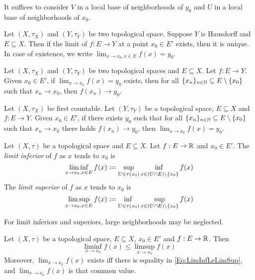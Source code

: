 \documentclass{techreport}
\begin{document}
\begin{remark}\label{Rem:LimitsConsiderLocalbase}
	It suffices to consider $V$ in a local base of neighborhoods of $y_0$ and $U$ in a local base of neighborhoods of $x_0$.
\end{remark}

\begin{proposition}\label{Prop:LimitIntoT2AtMostOne}
	Let $(X,\tau_X)$ and $(Y,\tau_Y)$ be two topological space.
	Suppose $Y$ is Hausdorff and $E \subseteq X$.
	Then if the limit of $f : E \to Y$ at a point $x_0 \in E'$ exists, then it is unique.
	In case of existence, we write $\lim_{x \to x_0, x \in E} f(x) = y_0$.
\end{proposition}

\begin{proposition}\label{Prop:LimitImlySeqConv}
	Let $(X,\tau_X)$ and $(Y,\tau_Y)$ be two topological spaces and $E \subseteq X$.
	Let $f : E \to Y$.
	Given $x_0 \in E'$, if $\lim_{x \to x_0} f(x) = y_0$ exists, then for all $\{x_n\}_{n \in \mathbb{N}} \subseteq E \setminus \{x_0\}$ such that $x_n \rightarrow x_0$, then $f(x_n) \rightarrow y_0$.
\end{proposition}

\begin{proposition}\label{Prop:LimitFromFstCountExistIfSeqConv}
	Let $(X,\tau_X)$ be first countable.
	Let $(Y,\tau_Y)$ be a topological space, $E \subseteq X$ and $f: E \to Y$.
	Given $x_0 \in E'$, if there exists $y_0$ such that for all $\{x_n\}_{n \in \mathbb{N}} \subseteq E \setminus \{x_0\}$ such that $x_n \rightarrow x_0$ there holds $f(x_n) \rightarrow y_0$, then $\lim_{x \to x_0} f(x) = y_0$.
\end{proposition}

\begin{definition}\label{De:LimitInfAndSup}
	Let $(X,\tau)$ be a topological space and $E \subseteq X$.
	Let $f : E \to \mathbb{R}$ and $x_0 \in E'$.
	The \emph{limit inferior} of $f$ as $x$ tends to $x_0$ is
	\[
 	\liminf_{x \to x_0, x \in E} f(x) \coloneqq \adjustlimits \sup_{U \in \tau(x_0)} \inf_{x \in (U \cap E) \setminus \{x_0\}} f(x)
	\]
	The \emph{limit superior} of $f$ as $x$ tends to $x_0$ is
	\[
	\limsup_{x \to x_0, x \in E} f(x) \coloneqq \adjustlimits \inf_{U \in \tau(x_0)} \sup_{x \in (U \cap E) \setminus \{x_0\}} f(x)
	\]
\end{definition}

\begin{remark}\label{Rem:LimitInfAndSupNeglectLargeNeigh}
	For limit inferiors and superiors, large neighborhoods may be neglected.
\end{remark}

\begin{theorem}\label{The:LimInfLeLimSup}
	Let $(X,\tau)$ be a topological space, $E \subseteq X$, $x_0 \in E'$ and $f : E \to \mathbb{R}$.
	Then
	\begin{equation}
		\liminf_{x \to x_0} f(x) \le \limsup_{x \to x_0} f(x) \label{Eq:LimInfLeLimSup}
	\end{equation}
	Moreover, $\lim_{x \to x_0} f(x)$ exists iff there is equality in \eqref{Eq:LimInfLeLimSup}, and $\lim_{x \to x_0} f(x)$ is that common value.
\end{theorem}
\end{document}
